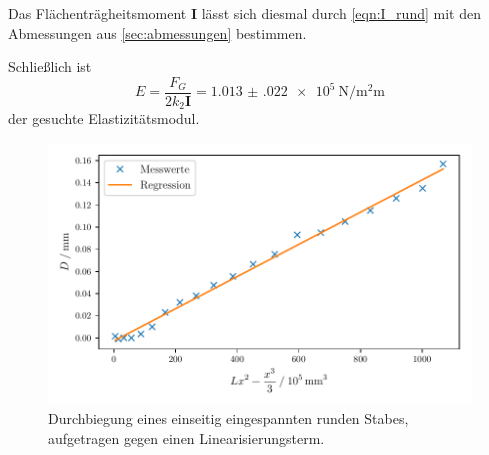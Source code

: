 Das Flächenträgheitsmoment $\mathbf{I}$ lässt sich diesmal durch \autoref{eqn:I_rund} mit den Abmessungen aus \autoref{sec:abmessungen} bestimmen.
%

Schließlich ist
\begin{equation*}
  E
  = \frac{F_G}{2 k_2 \mathbf{I}}
  = \SI[{scientific-notation = true, separate-uncertainty = true}]{1.013(022)e5}{\newton\per\square\milli\meter}
\end{equation*}
der gesuchte Elastizitätsmodul.


\begin{figure}
  \centering
  \includegraphics[scale=0.8]{build/plot_einseitig_rund.pdf}
  \caption{Durchbiegung eines einseitig eingespannten runden Stabes, aufgetragen gegen einen Linearisierungsterm.}
  \label{fig:regression2}
\end{figure}
